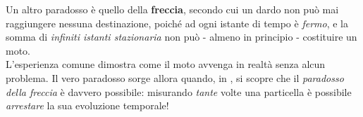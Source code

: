 \documentclass[../../InformazioneQuantistica.tex]{subfiles}
\begin{document}
Un altro paradosso è quello della \textbf{freccia}, secondo cui un dardo non può mai raggiungere nessuna destinazione, poiché ad ogni istante di tempo è \textit{fermo}, e la somma di \textit{infiniti istanti stazionaria} non può - almeno in principio - costituire un moto.\\

L'esperienza comune dimostra come il moto avvenga in realtà senza alcun problema. Il vero paradosso sorge allora quando, in \MQ, si scopre che il \textit{paradosso della freccia} è davvero possibile: misurando \textit{tante} volte una particella è possibile \textit{arrestare} la sua evoluzione temporale!
\end{document}

